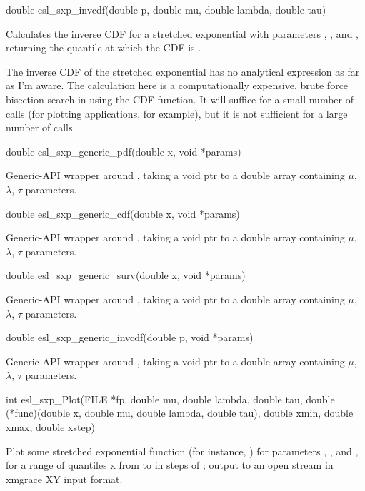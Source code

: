 \begin{sreapi}
\hypertarget{func:esl_sxp_invcdf()}
{\item[double esl\_sxp\_invcdf(double p, double mu, double lambda, double tau)]}

Calculates the inverse CDF for a stretched exponential
with parameters , , and , returning
the quantile  at which the CDF is .

The inverse CDF of the stretched exponential has no
analytical expression as far as I'm aware. The calculation
here is a computationally expensive, brute force bisection
search in  using the CDF function. It will suffice for
a small number of calls (for plotting applications, for example),
but it is not sufficient for a large number of calls.


\hypertarget{func:esl_sxp_generic_pdf()}
{\item[double esl\_sxp\_generic\_pdf(double x, void *params)]}

Generic-API wrapper around , taking
a void ptr to a double array containing $\mu$, $\lambda$,
$\tau$ parameters.


\hypertarget{func:esl_sxp_generic_cdf()}
{\item[double esl\_sxp\_generic\_cdf(double x, void *params)]}

Generic-API wrapper around , taking
a void ptr to a double array containing $\mu$, $\lambda$,
$\tau$ parameters.


\hypertarget{func:esl_sxp_generic_surv()}
{\item[double esl\_sxp\_generic\_surv(double x, void *params)]}

Generic-API wrapper around , taking
a void ptr to a double array containing $\mu$, $\lambda$,
$\tau$ parameters.


\hypertarget{func:esl_sxp_generic_invcdf()}
{\item[double esl\_sxp\_generic\_invcdf(double p, void *params)]}

Generic-API wrapper around , taking
a void ptr to a double array containing $\mu$, $\lambda$,
$\tau$ parameters.


\hypertarget{func:esl_sxp_Plot()}
{\item[int esl\_sxp\_Plot(FILE *fp, double mu, double lambda, double tau,
	     double (*func)(double x, double mu, double lambda, double tau), 
	     double xmin, double xmax, double xstep)]}

Plot some stretched exponential function  (for instance,
) for parameters , , and , for
a range of quantiles x from  to  in steps of ;
output to an open stream  in xmgrace XY input format.


\end{sreapi}
